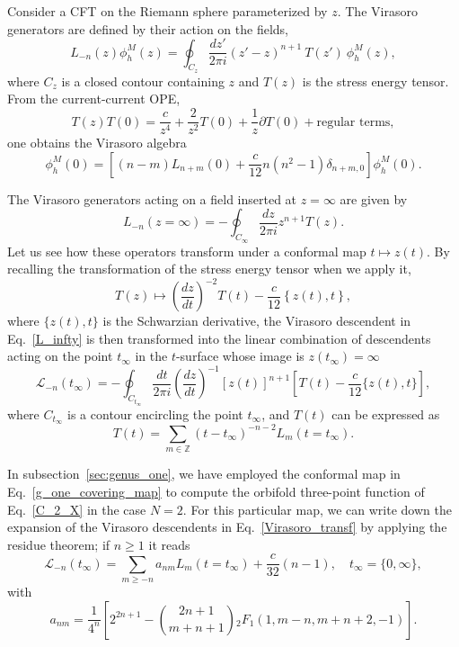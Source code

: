 \documentclass[a4paper,11pt]{article}
\begin{document}
Consider a CFT on the Riemann sphere parameterized by $z$. The Virasoro 
generators are defined by their action on the fields,
\begin{equation}
\label{vir_ln}
 L_{-n}(z)\phi^{M}_h(z)=\oint_{C_{z}}\frac{dz'}{2\pi i}(z'-z)^{n+1}~T(z')~\phi^{M}_h(z),
\end{equation}
where $C_{z}$ is a closed contour containing $z$ and $T(z)$ is the stress energy tensor. 
From the current-current OPE,
\begin{equation}
T(z) T(0)= \frac{c}{z^4}+ \frac{2}{z^2} T(0)+\frac{1}{z}\partial T (0)+\text{regular terms},
\end{equation} 
one obtains the  Virasoro algebra
\begin{equation}
 [L_n(0), L_{m}(0)]\phi^{M}_h(0) =\left[(n-m) L_{n+m}(0)+\frac{c}{12}n(n^2-1)\delta_{n+m, 0}\right]\phi^{M}_h(0).
\end{equation}

The Virasoro generators acting on a field inserted at $z=\infty$ are given by
\begin{equation}\label{L_infty}
 L_{-n}(z=\infty)=-\oint_{C_{\infty}}\frac{dz}{2\pi i}z^{n+1}T(z).
\end{equation}
Let us see how these operators transform under a conformal map
$t \mapsto z(t)$. By recalling the transformation of the stress energy tensor 
when we apply it,
\begin{equation}
T(z)\mapsto \left(\frac{d z}{d t}\right)^{-2} T(t)-\frac{c}{12}\left\{z(t),t\right\},
\end{equation}
where $\{z(t),t\}$ is the Schwarzian derivative, the Virasoro descendent in Eq.~\eqref{L_infty}
is then transformed into the linear combination of descendents acting on the point
$t_\infty$ in the $t$-surface whose image is $z(t_\infty)=\infty$
\begin{equation}\label{Virasoro_transf}
 \mathcal{L}_{-n}(t_\infty)=-\oint_{C_{t_\infty}}\frac{dt}{2\pi i}
 \left(\frac{dz}{dt}\right)^{-1}[z(t)]^{n+1}\left[T(t)-\frac{c}{12}\{z(t), t\}\right],
\end{equation}
where $C_{t_\infty}$ is a contour encircling the point $t_\infty$, and $T(t)$ can be 
expressed as
\begin{equation}
 T(t)=\sum_{m\in\mathbb{Z}}(t-t_\infty)^{-n-2}L_m(t=t_\infty).
\end{equation}


In subsection~\ref{sec:genus_one}, we have employed the conformal map
in Eq.~\eqref{g_one_covering_map} to compute the orbifold three-point function
of Eq.~\eqref{C_2_X} in the case $N=2$. For this particular map, 
we can write down the expansion of the Virasoro descendents in Eq.~\eqref{Virasoro_transf}
by applying the residue theorem; if $n\geq 1$ it reads
\begin{equation}\label{vir_g1_1}
 \mathcal{L}_{-n}(t_{\infty})=\sum_{m\geq -n} a_{nm} L_{m}(t=t_{\infty})+\frac{c}{32}(n-1), \quad t_{\infty}=\{0,\infty\},
\end{equation}
with
\begin{equation}\label{vir_g1_2}
 a_{nm}=\frac{1}{4^n}\left[2^{2n+1}-\binom{2n+1}{m+n+1}{}_2F_1(1, m-n, m+n+2, -1)\right].
\end{equation}
\end{document}
